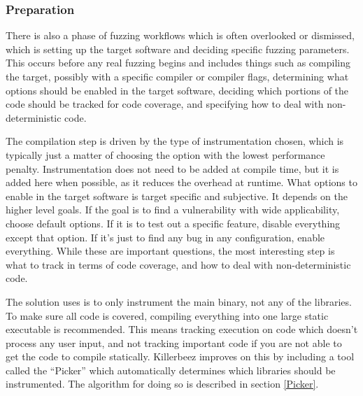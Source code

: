 \subsubsection{Preparation}  \label{Preparation Overview}
There is also a phase of fuzzing workflows which is often overlooked or
dismissed, which is setting up the target software and deciding specific
fuzzing parameters. This occurs before any real fuzzing begins and includes
things such as compiling the target, possibly with a specific compiler or
compiler flags, determining what options should be enabled in the target
software, deciding which portions of the code should be tracked for code
coverage, and specifying how to deal with non-deterministic code.

The compilation step is driven by the type of instrumentation chosen,
which is typically just a matter of choosing the option with the lowest
performance penalty. Instrumentation does not need to be added at compile
time, but it is added here when possible, as it reduces the overhead at runtime.
What options to enable in the target software is target specific and
subjective.  It depends on the higher level goals.  If the goal is to find a
vulnerability with wide applicability, choose default options. If it is to test
out a specific feature, disable everything except that option. If it's just to
find any bug in any configuration, enable everything.  While these are
important questions, the most interesting step is what to track in terms of
code coverage, and how to deal with non-deterministic code.

The solution \AFL{} uses is to only instrument the main binary, not any of the
libraries. To make sure all code is covered, compiling everything into one
large static executable is recommended. This means tracking execution on code
which doesn't process any user input, and not tracking important code if you
are not able to get the code to compile statically. Killerbeez improves on this
by including a tool
called the ``Picker'' which automatically determines which libraries should be
instrumented.  The algorithm for doing so is described in section \ref{Picker}.


